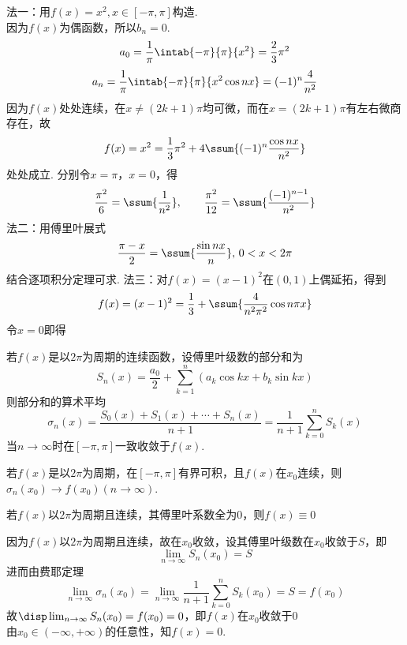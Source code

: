 \begin{analysis}
法一：用$f(x)=x^2,x\in[-\pi,\pi]$构造.\\
因为$f(x)$为偶函数，所以$b_n=0$.\\
\[a_0=\dfrac{1}{\pi}\intab{-\pi}{\pi}{x^2}=\dfrac{2}{3}\pi^2\]
\[a_n=\dfrac{1}{\pi}\intab{-\pi}{\pi}{x^2\cos nx}=(-1)^n\dfrac{4}{n^2}\]
因为$f(x)$处处连续，在$x\ne (2k+1)\pi$均可微，而在$x=(2k+1)\pi$有左右微商存在，故
\[f(x)=x^2=\dfrac{1}{3}\pi^2+4\ssum{(-1)^n\dfrac{\cos nx}{n^2}}\]
处处成立. 分别令$x=\pi$，$x=0$，得
\[\dfrac{\pi^2}{6}=\ssum{\dfrac{1}{n^2}},\qquad\dfrac{\pi^2}{12}=\ssum{\dfrac{(-1)^{n-1}}{n^2}}\]
法二：用傅里叶展式
\[\dfrac{\pi-x}{2}=\ssum{\dfrac{\sin nx}{n}},\,0<x<2\pi\]
结合逐项积分定理可求.
法三：对$f(x)=(x-1)^2$在$(0,1)$上偶延拓，得到
\[f(x)=(x-1)^2=\dfrac{1}{3}+\ssum{\dfrac{4}{n^2\pi^2}\cos n\pi x}\]
令$x=0$即得
\end{analysis}
\begin{theorem}[费耶(Fejer)]
若$f(x)$是以$2\pi$为周期的连续函数，设傅里叶级数的部分和为
\[S_n(x)=\dfrac{a_0}{2}+\sum_{k=1}^n(a_k\cos kx+b_k\sin kx)\]
则部分和的算术平均
\[\sigma_n(x)=\dfrac{S_0(x)+S_1(x)+\cdots+S_n(x)}{n+1}=\dfrac{1}{n+1}\sum_{k=0}^nS_k(x)\]
当$n\to\infty$时在$[-\pi,\pi]$一致收敛于$f(x)$.
\end{theorem}
\begin{corollary2}
若$f(x)$是以$2\pi$为周期，在$[-\pi,\pi]$有界可积，且$f(x)$在$x_0$连续，则$\sigma_n(x_0)\to f(x_0)(n\to\infty)$.
\end{corollary2}
\begin{example}
若$f(x)$以$2\pi$为周期且连续，其傅里叶系数全为$0$，则$f(x)\equiv 0$
\end{example}
\begin{analysis}
因为$f(x)$以$2\pi$为周期且连续，故在$x_0$收敛，设其傅里叶级数在$x_0$收敛于$S$，即
\[\lim_{n\to\infty}S_n(x_0)=S\]
进而由费耶定理
\[\lim_{n\to\infty}\sigma_n(x_0)=\lim_{n\to\infty}\dfrac{1}{n+1}\sum_{k=0}^nS_k(x_0)=S=f(x_0)\]
故$\disp\lim_{n\to\infty}S_n(x_0)=f(x_0)=0$，即$f(x)$在$x_0$收敛于$0$\\
由$x_0\in(-\infty,+\infty)$的任意性，知$f(x)=0$.
\end{analysis}